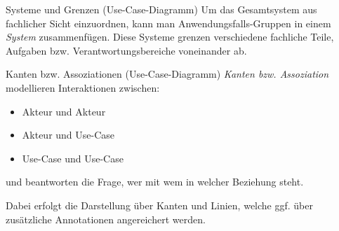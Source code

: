\begin{diag}{Systeme und Grenzen (Use-Case-Diagramm)}
    Um das Gesamtsystem aus fachlicher Sicht einzuordnen, kann man Anwendungsfalls-Gruppen in einem \emph{System} zusammenfügen.
    Diese Systeme grenzen verschiedene fachliche Teile, Aufgaben bzw. Verantwortungsbereiche voneinander ab.

\end{diag}

\begin{diag}{Kanten bzw. Assoziationen (Use-Case-Diagramm)}
    \emph{Kanten bzw. Assoziation} modellieren Interaktionen zwischen:
    \begin{itemize}
        \item Akteur und Akteur
        \item Akteur und Use-Case
        \item Use-Case und Use-Case
    \end{itemize}
    und beantworten die Frage, wer mit wem in welcher Beziehung steht.

    Dabei erfolgt die Darstellung über Kanten und Linien, welche ggf. über zusätzliche Annotationen angereichert werden.
\end{diag}

